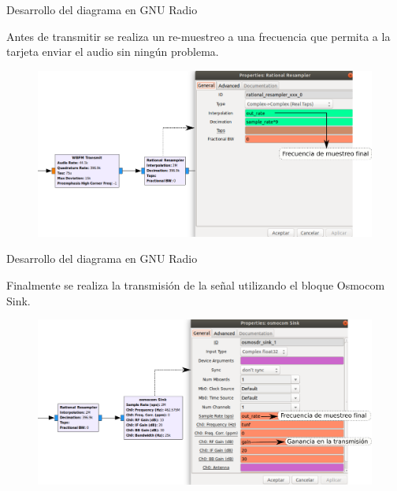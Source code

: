 \begin{frame}{Desarrollo del diagrama en GNU Radio}

Antes de transmitir se realiza un re-muestreo a una frecuencia que permita a la tarjeta enviar el audio sin ningún problema.

\begin{figure}[H]
\centering
\vspace{-3mm}
\includegraphics[width=\textwidth]{parte3/lab14/pdf/Lab14_7.pdf}
\end{figure}


\end{frame}

\begin{frame}{Desarrollo del diagrama en GNU Radio}

Finalmente se realiza la transmisión de la señal utilizando el bloque Osmocom Sink.

\begin{figure}[H]
\centering
\vspace{-3mm}
\includegraphics[width=\textwidth]{parte3/lab14/pdf/Lab14_8.pdf}
\end{figure}

\end{frame}

